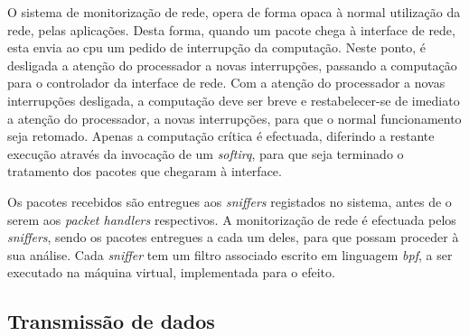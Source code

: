

O sistema de monitorização de rede, opera de forma opaca à normal utilização da rede, pelas aplicações.
Desta forma, quando um pacote chega à interface de rede, esta envia ao cpu um pedido de interrupção da computação.
Neste ponto, é desligada a atenção do processador a novas interrupções, passando a computação para o controlador da interface de rede.
Com a atenção do processador a novas interrupções desligada, a computação deve ser breve e restabelecer-se de imediato a atenção do processador, a novas interrupções, para que o normal funcionamento seja retomado.
Apenas a computação crítica é efectuada, diferindo a restante execução através da invocação de um \textit{softirq}, para que seja terminado o tratamento dos pacotes que chegaram à interface.

Os pacotes recebidos são entregues aos \textit{sniffers} registados no sistema, antes de o serem aos \textit{packet handlers} respectivos.
A monitorização de rede é efectuada pelos \textit{sniffers}, sendo os pacotes entregues a cada um deles, para que possam proceder à sua análise.
Cada \textit{sniffer} tem um filtro associado escrito em linguagem \textit{bpf}, a ser executado na máquina virtual, implementada para o efeito.




\subsection{Transmissão de dados}

